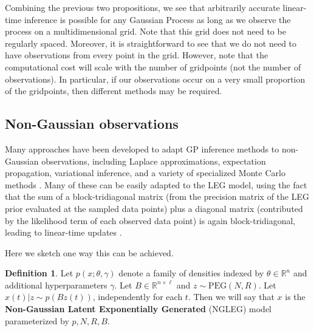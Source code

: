 \documentclass{article}
\theoremstyle{definition}
\newtheorem{definition}{Definition}
\newcommand{\PEG}{\mathrm{PEG}}
\begin{document}
Combining the previous two propositions, we see that arbitrarily accurate linear-time inference is possible for any Gaussian Process as long as we observe the process on a multidimensional grid.  Note that this grid does not need to be regularly spaced.  Moreover, it is straightforward to see that we do not need to have observations from every point in the grid.   However, note that the computational cost will scale with the number of gridpoints (not the number of observations).  In particular, if our observations occur on a very small proportion of the gridpoints, then different methods may be required.

\subsection{Non-Gaussian observations}  

Many approaches have been developed to adapt GP inference methods to non-Gaussian observations, including Laplace approximations, expectation propagation, variational inference, and a variety of specialized Monte Carlo methods \cite{hartikainen2011sparse,riihimaki2014laplace,nguyen2014automated,nishihara2014parallel}.  Many of these can be easily adapted to the LEG model, using the fact that the sum of a block-tridiagonal matrix (from the precision matrix of the LEG prior evaluated at the sampled data points) plus a diagonal matrix (contributed by the likelihood term of each observed data point) is again block-tridiagonal, leading to linear-time updates \cite{smith2003estimating,Paninski2010,fahrmeir2013multivariate,polson2013bayesian,Khan,Nickisch}.

Here we sketch one way this can be achieved.  

\begin{definition}
Let $p(x;\theta,\gamma)$ denote a family of densities indexed by $\theta \in \mathbb{R}^n$ and additional hyperparameters $\gamma$.  Let $B \in \mathbb{R}^{n \times \ell}$ and $z \sim \PEG(N,R)$.  Let $x(t) | z \sim p(B z(t))$, independently for each $t$.  Then we will say that $x$ is the \textbf{Non-Gaussian Latent Exponentially Generated} (NGLEG) model parameterized by $p,N,R,B$.
\end{definition}
\end{document}

